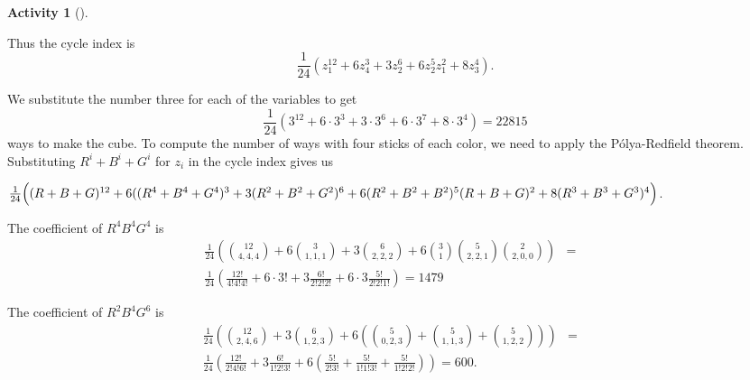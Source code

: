 \documentclass[10pt,]{book}
\theoremstyle{plain}
\theoremstyle{definition}
\newtheorem{activity}[project]{Activity}
\numberwithin{equation}{chapter}
\newcommand{\amp}{&}
\begin{document}
\begin{activity}[]
\begin{enumerate}[label=(\alph*)]
\end{enumerate}
Thus the cycle index is%
\begin{equation*}
\frac{1}{24}\left(z_1^{12}+6z_4^3+3z_2^6+6z_2^5z_1^2 + 8z_3^4\right).
\end{equation*}
%
\par
We substitute the number three for each of the variables to get%
\begin{equation*}
\frac{1}{24}\left(3^{12}+6\cdot 3^3+3\cdot3^6+6\cdot 3^7 +8\cdot3^4\right)=22815
\end{equation*}
ways to make the cube. To compute the number of ways with four sticks of each color, we need to apply the Pólya-Redfield theorem. Substituting \(R^i+B^i+G^i\) for \(z_i\) in the cycle index gives us%
\par
\(\frac{1}{24}\Big((R+B+G)^{12}+6((R^4+B^4+G^4)^3+3(R^2+B^2+G^2)^6+\\6(R^2+B^2+B^2)^5(R+B+G)^2
+8(R^3+B^3+G^3)^4\Big)\).%
\par
The coefficient of \(R^4B^4G^4\) is%
\begin{align*}
\frac{1}{24}\left(\binom{12}{4,4,4}+6\binom{3}{1,1,1}+3\binom{6}{2,2,2}+
6\binom{3}{1}\binom{5}{2,2,1}\binom{2}{2,0,0}
\right)\amp =\amp\\
\frac{1}{24}\left(\frac{12!}{4!4!4!}+6\cdot3!+3\frac{6!}{2!2!2!}+6\cdot3\frac{5!}{2!2!1!}\right)=1479\amp \amp
\end{align*}
%
\par
The coefficient of \(R^2B^4G^6\) is%
\begin{align*}
\frac{1}{24}\left(\binom{12}{2,4,6}
+3\binom{6}{1,2,3}+6\left(\binom{5}{0,2,3}+\binom{5}{1,1,3}+\binom{5}{1,2,2}\right)\right)\amp =\amp\\
\frac{1}{24}\left(\frac{12!}{2!4!6!}+3\frac{6!}{1!2!3!}+6\left(\frac{5!}{2!3!}+\frac{5!}{1!1!3!}
+\frac{5!}{1!2!2!}\right)\right)=600.
\end{align*}
%
\end{activity}
\end{document}
